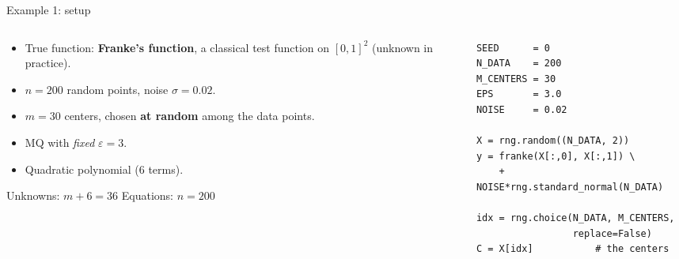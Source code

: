 \documentclass[10pt,aspectratio=169]{beamer}
\newcommand{\hl}[1]{\textcolor{accent}{\textbf{#1}}}
\begin{document}
\begin{frame}[fragile]{Example 1: setup}
  \begin{columns}[T]
    \begin{column}{0.52\textwidth}
      \begin{itemize}
        \item True function: \hl{Franke's function}, a classical test function
              on $[0,1]^2$ (unknown in practice).
        \item $n = 200$ random points, noise $\sigma = 0.02$.
        \item $m = 30$ centers, chosen \hl{at random} among the data points.
        \item MQ with \emph{fixed} $\varepsilon = 3$.
        \item Quadratic polynomial (6 terms).
      \end{itemize}
      \vspace{0.3em}
      Unknowns: $m + 6 = 36$ \quad Equations: $n = 200$
    \end{column}
    \begin{column}{0.44\textwidth}
\begin{lstlisting}
SEED      = 0
N_DATA    = 200
M_CENTERS = 30
EPS       = 3.0
NOISE     = 0.02

X = rng.random((N_DATA, 2))
y = franke(X[:,0], X[:,1]) \
    + NOISE*rng.standard_normal(N_DATA)

idx = rng.choice(N_DATA, M_CENTERS,
                 replace=False)
C = X[idx]           # the centers
\end{lstlisting}
    \end{column}
  \end{columns}
\end{frame}
\end{document}
